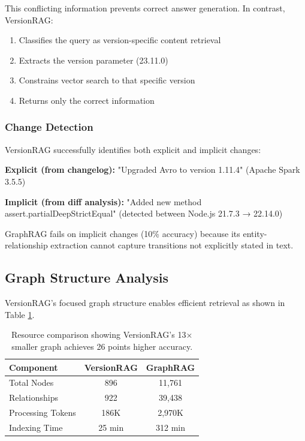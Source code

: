 This conflicting information prevents correct answer generation. In contrast, VersionRAG:
\begin{enumerate}
    \item Classifies the query as version-specific content retrieval
    \item Extracts the version parameter (23.11.0)
    \item Constrains vector search to that specific version
    \item Returns only the correct information
\end{enumerate}

\subsubsection{Change Detection}

VersionRAG successfully identifies both explicit and implicit changes:

\textbf{Explicit (from changelog):} "Upgraded Avro to version 1.11.4" (Apache Spark 3.5.5)

\textbf{Implicit (from diff analysis):} "Added new method assert.partialDeepStrictEqual" (detected between Node.js 21.7.3 → 22.14.0)

GraphRAG fails on implicit changes (10\% accuracy) because its entity-relationship extraction cannot capture transitions not explicitly stated in text.

\subsection{Graph Structure Analysis}

VersionRAG's focused graph structure enables efficient retrieval as shown in Table \ref{tab:graph_structure_analysis}.

\begin{table}[h]
\centering
\small
\caption{Resource comparison showing VersionRAG's 13× smaller graph achieves 26 points higher accuracy.}
\begin{tabular}{lcc}
\hline
\textbf{Component} & \textbf{VersionRAG} & \textbf{GraphRAG} \\ \hline
Total Nodes & 896 & 11,761 \\
Relationships & 922 & 39,438 \\
Processing Tokens & 186K & 2,970K \\
Indexing Time & 25 min & 312 min \\ \hline
\end{tabular}
\label{tab:graph_structure_analysis}
\end{table}

